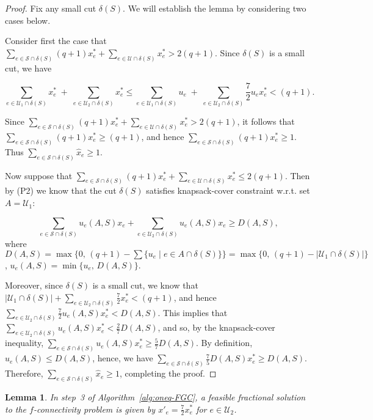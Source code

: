\documentclass[11pt]{article}
\newtheorem{lemma}[theorem]{Lemma}
\newcommand{\safe}{\mathscr{S}}
\newcommand{\unsafe}{\mathscr{U}}
\begin{document}
{{\begin{proof}
Fix any small cut $\delta(S)$. We will establish the lemma by considering two cases below.

Consider first the case that $\sum_{e\in\safe\cap\delta(S)} (q+1) x^*_e + \sum_{e\in\unsafe\cap\delta(S)} x^*_e > 2(q+1)$. Since $\delta(S)$ is a small cut, we have

$$ \sum_{e\in \unsafe_1\cap\delta(S)}x^*_e \;+\; \sum_{e\in \unsafe_2\cap\delta(S)}x^*_e \le  \sum_{e\in \unsafe_1\cap\delta(S)}u_e \;+\; \sum_{e\in \unsafe_2\cap\delta(S)}\frac{7}{2} u_ex^*_e < (q+1) .$$

Since $\sum_{e\in\safe\cap\delta(S)} (q+1) x^*_e + \sum_{e\in\unsafe\cap\delta(S)} x^*_e > 2(q+1)$, it follows that $\sum_{e\in\safe\cap\delta(S)} (q+1) x^*_e \geq (q+1)$, and hence $\sum_{e\in\safe\cap\delta(S)} (q+1) x^*_e \geq 1$. Thus $\sum_{e\in \safe\cap\delta(S)} \hat{x}_e \geq 1$.

Now suppose that $\sum_{e\in\safe\cap\delta(S)} (q+1) x^*_e + \sum_{e\in\unsafe\cap\delta(S)} x^*_e \leq 2(q+1)$. Then by (P2) we know that the cut $\delta(S)$ satisfies knapsack-cover constraint w.r.t. set $A = \unsafe_1$:

\[
\sum_{e\in \safe\cap\delta(S)} u_e(A,S) x_e +
	\sum_{e\in \unsafe_{2}\cap\delta(S)} u_e(A,S) x_e \geq D(A,S),
\]
where $D(A,S) = \max\{0,\, (q+1)-\sum\{ u_e \mid e\in{A}\cap\delta(S) \}\} =
	\max\{0,\, (q+1)-|\unsafe_1\cap\delta(S)|\}$,
$u_e(A,S) = \min\{u_e,\, D(A,S)\}$.

Moreover, since $\delta(S)$ is a small cut, we know that $|\unsafe_1\cap\delta(S)| + \sum_{e\in \unsafe_{2}\cap\delta(S)} \frac{7}{2} x^*_e < (q+1)$,
and hence $\sum_{e\in \unsafe_{2}\cap\delta(S)} \frac{7}{2} u_e(A,S) x^*_e < D(A,S)$.
This implies that $\sum_{e\in \unsafe_{2}\cap\delta(S)} u_e(A,S) x^*_e < \frac{2}{7} D(A,S)$,
and so, by the knapsack-cover inequality,
$\sum_{e\in \safe\cap\delta(S)} u_e(A,S) x^*_e \geq \frac{5}{7} D(A,S)$.
By definition, $u_e(A,S) \leq D(A,S)$, hence, we have
$\sum_{e\in \safe\cap\delta(S)} \frac{7}{5} D(A,S) x^*_e \geq D(A,S)$. Therefore,
$\sum_{e\in \safe\cap\delta(S)} \hat{x}_e \geq 1$, completing the proof.  
\end{proof}

\begin{lemma}\label{lem:oneqfgc2}
In step~3 of Algorithm~\ref{alg:oneq-FGC}, a feasible fractional
solution to the $f$-connectivity problem is given by
	$x'_e = \frac{7}{2} x^*_e$ for $e\in \unsafe_{2}$.
\end{lemma}

}}
\end{document}
